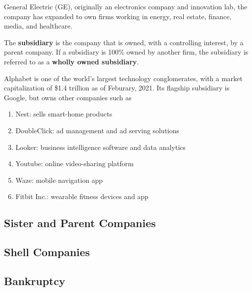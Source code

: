 \documentclass{article}
\begin{document}
    \begin{example}
      \label{ex:general-electric}
      General Electric (GE), originally an electronics company and innovation lab, the company has expanded to own firms working in energy, real estate, finance, media, and healthcare. 
    \end{example}

    \begin{definition}[Subsidiary]
      \label{def:subsidiary}
      The \textbf{subsidiary} is the company that is owned, with a controlling interest, by a parent company. If a subsidiary is 100\% owned by another firm, the subsidiary is referred to as a \textbf{wholly owned subsidiary}. 
    \end{definition}

    \begin{example}[Alphabet]
      \label{ex:alphabet}
      Alphabet is one of the world's largest technology conglomerates, with a market capitalization of \$1.4 trillion as of Feburary, 2021. Its flagship subsidiary is Google, but owns other companies such as
      \begin{enumerate}
        \item Nest: sells smart-home products
        \item DoubleClick: ad management and ad serving solutions
        \item Looker: business intelligence software and data analytics
        \item Youtube: online video-sharing platform
        \item Waze: mobile navigation app
        \item Fitbit Inc.: wearable fitness devices and app
      \end{enumerate}
    \end{example}

  \subsection{Sister and Parent Companies}


  \subsection{Shell Companies}


  \subsection{Bankruptcy}
\end{document}

